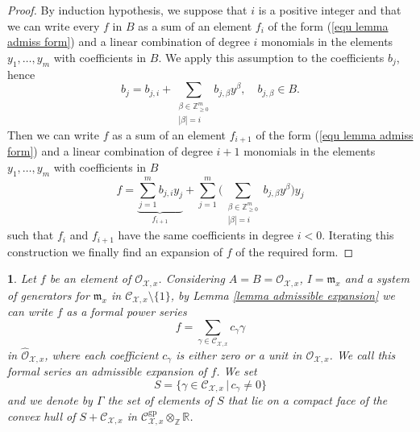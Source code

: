 \documentclass{amsart}%
\numberwithin{equation}{subsection}
\theoremstyle{plain2}
\theoremstyle{definition2}
\theoremstyle{stepstyle}
\theoremstyle{point}
\theoremstyle{subpoint}
\newtheorem{subpoint}[equation]{}%
\newcommand{\spa}[1]{\begin{subpoint}#1\end{subpoint}}           %
\newcommand{\Z}{\ensuremath{\mathbb{Z}}}
\newcommand{\R}{\ensuremath{\mathbb{R}}}
\newcommand{\cX}{\ensuremath{\mathscr{X}}}
\newcommand{\caC}{\ensuremath{\mathcal{C}}}
\newcommand{\caO}{\ensuremath{\mathcal{O}}}
\renewcommand{\R}{\ensuremath{\mathbb{R}}}
\newcommand{\gp}{\mathrm{gp}}
\begin{document}
{\begin{proof}
By induction hypothesis, we suppose that $i$ is a positive integer and that we can write every $f$ in $B$ as a sum of an element $f_i$ of the form (\ref{equ lemma admiss form}) and a linear combination of degree $i$ monomials in the elements $y_1,\ldots, y_m$ with coefficients in $B$. We apply this assumption to the coefficients $b_j$, hence
$$b_j=b_{j,i} + \sum_{\substack{\beta \in \Z^m_{\geqslant 0} \\|\beta|=i}} b_{j,\beta} y^\beta, \quad b_{j, \beta} \in B.$$ Then we can write $f$ as a sum of an element $f_{i+1}$ of the form (\ref{equ lemma admiss form}) and a linear combination of degree $i+1$ monomials in the elements $y_1,\ldots,y_m$ with coefficients in $B$
$$ f=\underbrace{\sum_{j=1}^{m} b_{j,i} y_j}_{f_{i+1}} + \sum_{j=1}^{m}\Big( \sum_{\substack{\beta \in \Z^m_{\geqslant 0} \\|\beta|=i}} b_{j,\beta} y^\beta \Big) y_j$$ such that $f_i$ and $f_{i+1}$ have the same coefficients in degree $i < 0$. Iterating this construction we finally find an expansion of $f$ of the required form.
\end{proof}}

\spa{ \label{paragr admissible expansion}Let $f$ be an element of $\mathcal{O}_{\cX,x}$. Considering $A=B=\caO_{\cX,x}$, $I=\mathfrak{m}_x$ and a system of generators for $\mathfrak{m}_x$ in $\caC_{\cX,x} \setminus \{1\}$, by Lemma \ref{lemma admissible expansion} we can write $f$ as a formal power series
\begin{equation}\label{eq-adm}
f=\sum_{\gamma \in \mathcal{C}_{\cX,x}}c_{\gamma}\gamma
\end{equation}
 in
$\widehat{\mathcal{O}}_{\cX,x}$, where each coefficient $c_\gamma$
 is either zero or a unit in $\mathcal{O}_{\cX,x}$. We call this formal series an \textit{admissible expansion} of $f$. We set
 \begin{equation}\label{equ def S}
S=\{\gamma\in\mathcal{C}_{\cX,x}\,|\,c_\gamma\neq 0\}
 \end{equation} and we denote by $\Gamma$ the set of
 elements of $S$ that lie on a compact face of the convex hull of
$S+ \mathcal{C}_{\cX,x}$ in
$\mathcal{C}^{\gp}_{\cX,x}\otimes_{\Z}\R$.}
\end{document}

